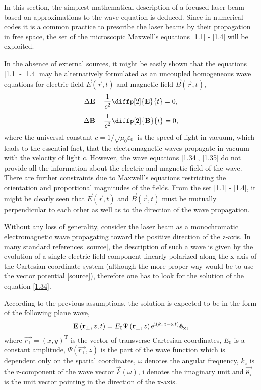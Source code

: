 In this section, the simplest mathematical description of a focused laser beam based on approximations to the wave equation is deduced. Since in numerical codes it is a common practice to prescribe the laser beams by their propagation in free space, the set of the microscopic Maxwell's equations \ref{1.1} - \ref{1.4} will be exploited.

In the absence of external sources, it might be easily shown that the equations \ref{1.1} - \ref{1.4} may be alternatively formulated as an uncoupled homogeneous wave equations for electric field $ \vec{E}\left( \vec{r}, t \right) $ and magnetic field $ \vec{B}\left( \vec{r}, t \right) $,
\begin{equation}
\label{1.34}
\laplace{\vec{E}} - \frac{1}{c^{2}} \diffp[2]{\vec{E}}{t} = 0,
\end{equation}
\begin{equation}
\label{1.35}
\laplace{\vec{B}} - \frac{1}{c^{2}} \diffp[2]{\vec{B}}{t} = 0,
\end{equation}
where the universal constant $ c = 1/\sqrt{\mu_0 \varepsilon_0} $ is the speed of light in vacuum, which leads to the essential fact, that the electromagnetic waves propagate in vacuum with the velocity of light $ c $. However, the wave equations \ref{1.34}, \ref{1.35} do not provide all the information about the electric and magnetic field of the wave. There are further constraints due to Maxwell's equations restricting the orientation and proportional magnitudes of the fields. From the set \ref{1.1} - \ref{1.4}, it might be clearly seen that $ \vec{E}\left( \vec{r}, t \right) $ and $ \vec{B}\left( \vec{r}, t \right) $ must be mutually perpendicular to each other as well as to the direction of the wave propagation. 

Without any loss of generality, consider the laser beam as a monochromatic electromagnetic wave propagating toward the positive direction of the z-axis. In many standard references [source], the description of such a wave is given by the evolution of a single electric field component linearly polarized along the x-axis of the Cartesian coordinate system (although the more proper way would be to use the vector potential [source]), therefore one has to look for the solution of the equation \ref{1.34}. 

According to the previous assumptions, the solution is expected to be in the form of the following plane wave,
\begin{equation}
\label{1.36}
\mathbf{E}\left(\mathbf{r_\bot}, z, t \right)  = E_0 \Psi \left(\mathbf{r_\bot}, z \right) \mathrm{e}^{\mathrm{i} \left(k_z z - \omega t \right)} \mathrm{\mathbf{\hat{e}_x}},
\end{equation}
where $ \vec{r_\bot} = (x, y)^{\mathrm{T}} $ is the vector of transverse Cartesian coordinates, $ E_0 $ is a constant amplitude, $ \Psi \left(\vec{r_\bot}, z \right) $ is the part of the wave function which is dependent only on the spatial coordinates, $ \omega $ denotes the angular frequency, $ k_z $ is the z-component of the wave vector $ \vec{k}\left(\omega \right) $, $ \mathrm{i} $ denotes the imaginary unit and $ \mathrm{\vec{\hat{e}_x}} $ is the unit vector pointing in the direction of the x-axis.

